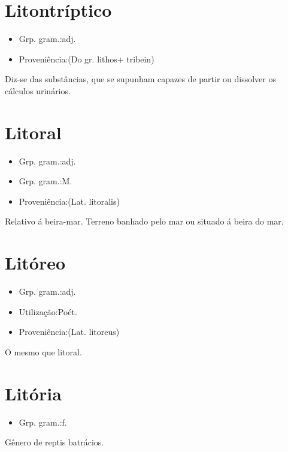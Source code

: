 \section{Litontríptico}
\begin{itemize}
\item {Grp. gram.:adj.}
\end{itemize}
\begin{itemize}
\item {Proveniência:(Do gr. \textunderscore lithos\textunderscore  + \textunderscore tribein\textunderscore )}
\end{itemize}
Diz-se das substâncias, que se supunham capazes de partir ou dissolver os cálculos urinários.
\section{Litoral}
\begin{itemize}
\item {Grp. gram.:adj.}
\end{itemize}
\begin{itemize}
\item {Grp. gram.:M.}
\end{itemize}
\begin{itemize}
\item {Proveniência:(Lat. \textunderscore litoralis\textunderscore )}
\end{itemize}
Relativo á beira-mar.
Terreno banhado pelo mar ou situado á beira do mar.
\section{Litóreo}
\begin{itemize}
\item {Grp. gram.:adj.}
\end{itemize}
\begin{itemize}
\item {Utilização:Poét.}
\end{itemize}
\begin{itemize}
\item {Proveniência:(Lat. \textunderscore litoreus\textunderscore )}
\end{itemize}
O mesmo que \textunderscore litoral\textunderscore .
\section{Litória}
\begin{itemize}
\item {Grp. gram.:f.}
\end{itemize}
Gênero de reptis batrácios.
